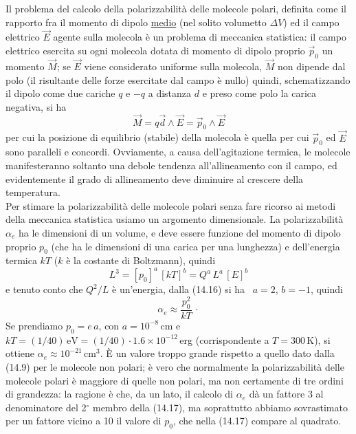 Il problema del calcolo della polarizzabilit\`a delle molecole polari, definita
come il rapporto fra il momento di dipolo \underline{medio} (nel solito
volumetto $\Delta V$) ed il campo elettrico $\vec E$ agente sulla molecola \`e
un problema di meccanica statistica: il campo elettrico esercita su ogni
molecola dotata di momento di dipolo proprio $\vec p_0$ un momento $\vec M$; se
$\vec E$ viene considerato uniforme sulla molecola, $\vec M$ non dipende dal
polo (il risultante delle forze esercitate dal campo \`e nullo) quindi,
schematizzando il dipolo come due cariche $q$ e $-q$ a distanza $d$ e preso come
polo la carica negativa, si ha
\begin{equation}
  \vec M=q\vec d\wedge\vec E=\vec p_0\wedge\vec E
  \tag{14.15}
\end{equation}
per cui la posizione di equilibrio (stabile) della molecola \`e quella per cui
$\vec p_0$ ed $\vec E$ sono paralleli e concordi. Ovviamente, a causa
dell'agitazione termica, le molecole manifesteranno soltanto una debole tendenza
all'allineamento con il campo, ed evidentemente il grado di allineamento deve
diminuire al crescere della temperatura.\\
Per stimare la polarizzabilit\`a delle molecole polari senza fare ricorso ai
metodi della meccanica statistica usiamo un argomento dimensionale. La
polarizzabilit\`a $\alpha_e$ ha le dimensioni di un volume, e deve essere
funzione del momento di dipolo proprio $p_0$ (che ha le dimensioni di una carica
per una lunghezza) e dell'energia termica $kT$ ($k$ \`e la costante di
Boltzmann), quindi
\begin{equation}
  L^3=[p_0]^a\,[kT]^b=Q^a\,L^a\,[E]^b
  \tag{14.16}
\end{equation}
e tenuto conto che $Q^2/L$ \`e un'energia, dalla (14.16) si ha \ $a=2$, $b=-1$,
quindi
\begin{equation}
  \alpha_e\approx\frac{p_0^2}{kT}\,\cdot
  \tag{14.17}
\end{equation}
Se prendiamo $p_0=e\,a$, con $a=10^{-8}$\,cm e
\ $kT=(1/40)\,\mathrm{eV}=(1/40)\cdot1.6\times10^{-12}$\,erg (corrispondente a
$T=300$\,K), si ottiene $\alpha_e\approx10^{-21}\,\mathrm{cm}^3$. \`E un valore
troppo grande rispetto a quello dato dalla (14.9) per le molecole non polari;
\`e vero che normalmente la polarizzabilit\`a delle molecole polari \`e maggiore
di quelle non polari, ma non certamente di tre ordini di grandezza: la ragione
\`e che, da un lato, il calcolo di $\alpha_e$ d\`a un fattore 3 al denominatore
del 2$^\circ$ membro della (14.17), ma soprattutto abbiamo sovrastimato per un
fattore vicino a 10 il valore di $p_0$, che nella (14.17) compare al quadrato.

